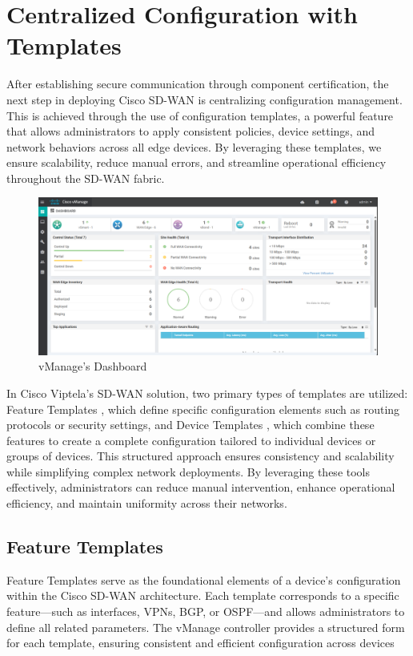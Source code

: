 \documentclass[12pt,english]{report}
\begin{document}
\section{Centralized Configuration with Templates}
After establishing secure communication through component certification, the next step in deploying Cisco SD-WAN is centralizing configuration management. This is achieved through the use of configuration templates, a powerful feature that allows administrators to apply consistent policies, device settings, and network behaviors across all edge devices. By leveraging these templates, we ensure scalability, reduce manual errors, and streamline operational efficiency throughout the SD-WAN fabric.
\begin{figure}[H]
    \centering
    \includegraphics[width= 1\textwidth]{chapitre 3/template/vmanage-gui.png}
    \caption{vManage's Dashboard}
    \label{fig:vmanage-dashboard}
\end{figure}
 In Cisco Viptela’s SD-WAN solution, two primary types of templates are utilized: Feature Templates , which define specific configuration elements such as routing protocols or security settings, and Device Templates , which combine these features to create a complete configuration tailored to individual devices or groups of devices. This structured approach ensures consistency and scalability while simplifying complex network deployments. 
 By leveraging these tools effectively, administrators can reduce manual intervention, enhance operational efficiency, and maintain uniformity across their networks.
 \subsection{Feature Templates}
 Feature Templates serve as the foundational elements of a device’s configuration within the Cisco SD-WAN architecture. Each template corresponds to a specific feature—such as interfaces, VPNs, BGP, or OSPF—and allows administrators to define all related parameters. The vManage controller provides a structured form for each template, ensuring consistent and efficient configuration across devices
\end{document}
